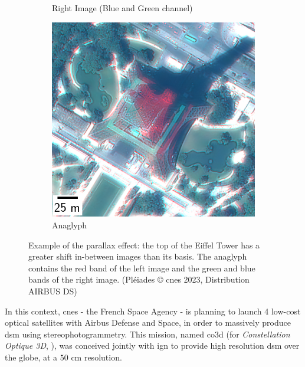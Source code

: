 \begin{figure}
\begin{subfigure}[t]{0.32\linewidth}
        \caption{Right Image (Blue and Green channel)}
        \label{fig:eiffel_tower_right}
    \end{subfigure}\hfill
    \begin{subfigure}[t]{0.32\linewidth}
        \flushright
        \includegraphics[width=\linewidth]{Images/0_Intro/eiffel_tower_ana.png}
        \caption{Anaglyph}
        \label{fig:eiffel_tower_ana}
    \end{subfigure}
    \caption{Example of the parallax effect: the top of the Eiffel Tower has a greater shift in-between images than its basis. The anaglyph contains the red band of the left image and the green and blue bands of the right image. (Pléiades © \acrshort{cnes} 2023, Distribution AIRBUS DS)}
    \label{fig:parallax}
\end{figure}


In this context, \acrshort{cnes} - the French Space Agency - is planning to launch 4 low-cost optical satellites with Airbus Defense and Space, in order to massively produce \acrshort{dsm} using stereophotogrammetry. This mission, named \acrshort{co3d} (for \textit{Constellation Optique 3D}, \cite{melet_co3d_2020}), was conceived jointly with \acrshort{ign} to provide high resolution \acrshort{dsm} over the globe, at a $50$ cm resolution.

